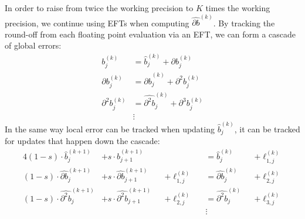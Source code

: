 \documentclass[letterpaper,10pt]{article}
\theoremstyle{definition}
\begin{document}
In order to raise from twice the working precision to \(K\) times the
working precision, we continue using EFTs when computing
\(\widehat{\partial b}^{(k)}\). By tracking the round-off from each
floating point evaluation via an EFT, we can form a cascade of global errors:
\begin{align}
  b_j^{(k)} &= \widehat{b}_j^{(k)} + \partial b_j^{(k)} \\
  \partial b_j^{(k)} &= \widehat{\partial b}_j^{(k)} + \partial^2 b_j^{(k)} \\
  \partial^2 b_j^{(k)} &= \widehat{\partial^2 b}_j^{(k)} +
  \partial^3 b_j^{(k)} \\
  & \vdots \nonumber
\end{align}
In the same way local error can be tracked when updating
\(\widehat{b}_j^{(k)}\), it can be tracked for updates that happen down
the cascade:
\begin{alignat}{4}
  (1 - s) \cdot \widehat{b}_j^{(k + 1)} &+
  s \cdot \widehat{b}_{j + 1}^{(k + 1)} &&  &&=
  \widehat{b}_j^{(k)} &&+ \ell_{1, j}^{(k)} \\
  (1 - s) \cdot \widehat{\partial b}_j^{(k + 1)} &+
  s \cdot \widehat{\partial b}_{j + 1}^{(k + 1)} &&+ \ell_{1, j}^{(k)} &&=
  \widehat{\partial b}_j^{(k)} &&+ \ell_{2, j}^{(k)} \\
  (1 - s) \cdot \widehat{\partial^2 b}_j^{(k + 1)} &+
  s \cdot \widehat{\partial^2 b}_{j + 1}^{(k + 1)} &&+ \ell_{2, j}^{(k)} &&=
  \widehat{\partial^2 b}_j^{(k)} &&+ \ell_{3, j}^{(k)} \\
  &  &&  &&\vdots && \nonumber
\end{alignat}
\end{document}
